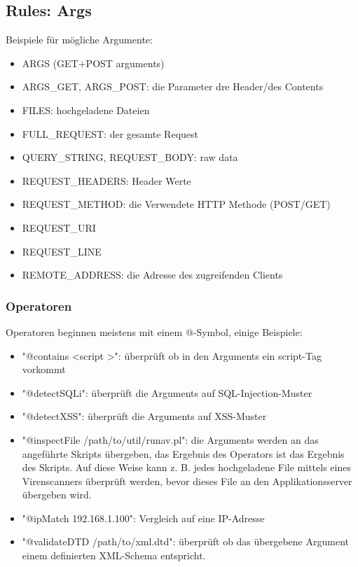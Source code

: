 \subsection{Rules: Args}

Beispiele für mögliche Argumente:

\begin{itemize}
	\item ARGS (GET+POST arguments)
	\item ARGS\_GET, ARGS\_POST: die Parameter dre Header/des Contents
	\item FILES: hochgeladene Dateien
	\item FULL\_REQUEST: der gesamte Request
	\item QUERY\_STRING, REQUEST\_BODY: raw data
	\item REQUEST\_HEADERS: Header Werte
	\item REQUEST\_METHOD: die Verwendete HTTP Methode (POST/GET)
	\item REQUEST\_URI
	\item REQUEST\_LINE
	\item REMOTE\_ADDRESS: die Adresse des zugreifenden Clients
\end{itemize}

\subsubsection{Operatoren}

Operatoren beginnen meistens mit einem @-Symbol, einige Beispiele:

\begin{itemize}
	\item "@contains <script >": überprüft ob in den Arguments ein script-Tag vorkommt
	\item "@detectSQLi": überprüft die Arguments auf SQL-Injection-Muster
	\item "@detectXSS": überprüft die Arguments auf XSS-Muster
	\item "@inspectFile /path/to/util/runav.pl": die Arguments werden an das angeführte Skripts übergeben, das Ergebnis des Operators ist das Ergebnis des Skripts. Auf diese Weise kann z. B. jedes hochgeladene File mittels eines Virenscanners überprüft werden, bevor dieses File an den Applikationsserver übergeben wird.
	\item "@ipMatch 192.168.1.100": Vergleich auf eine IP-Adresse
	\item "@validateDTD /path/to/xml.dtd": überprüft ob das übergebene Argument einem definierten XML-Schema entspricht.
\end{itemize}

